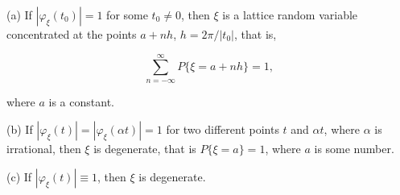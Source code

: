 (a) If $|\varphi_{\xi}(t_0)| = 1$ for some $t_0 \neq 0$, then $\xi$ is a lattice random variable concentrated at the points $a + nh$, $h = 2\pi/|t_0|$, that is,

$$\sum_{n=-\infty}^{\infty} P\{\xi = a + nh\} = 1,$$

where $a$ is a constant.

(b) If $|\varphi_{\xi}(t)| = |\varphi_{\xi}(\alpha t)| = 1$ for two different points $t$ and $\alpha t$, where $\alpha$ is irrational, then $\xi$ is degenerate, that is $P\{\xi = a\} = 1$, where $a$ is some number.

(c) If $|\varphi_{\xi}(t)| \equiv 1$, then $\xi$ is degenerate.
